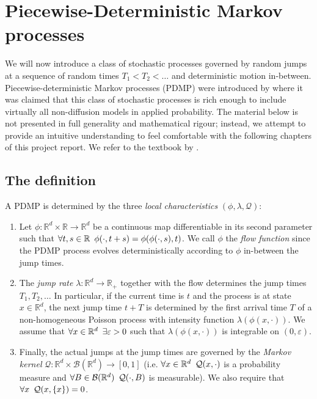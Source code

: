 \documentclass[report.tex]{subfiles}
\begin{document}
\section{Piecewise-Deterministic Markov processes}

We will now introduce a class of stochastic processes governed by random jumps at
a sequence of random times $T_{1} < T_{2} < \dots$ and deterministic motion
in-between. Piecewise-deterministic Markov processes (PDMP) were introduced by
\citet{davis1984piecewise} where it was claimed
that this class of stochastic processes is rich enough to include virtually
all non-diffusion models in applied probability.
The material below is not presented in full generality
and mathematical rigour; instead, we attempt to provide an intuitive
understanding to feel comfortable with the following chapters of this project
report.
We refer to the textbook by \citet{davis1993markov}.

\subsection{The definition}
\label{pdmp-definition}

A PDMP is determined by the three \textit{local characteristics}
$(\phi, \lambda, \mathcal{Q})$:

\begin{enumerate}
  \item Let $\phi : \mathbb{R}^{d} \times \mathbb{R} \to \mathbb{R}^{d}$
        be a continuous map differentiable in its second parameter such that
        $\forall t,s \in \mathbb{R} \enskip
        \phi(\cdot, t + s) = \phi(\phi(\cdot, s), t)$.
        We call $\phi$ the \textit{flow function} since the PDMP process evolves
        deterministically according to $\phi$ in-between the jump times.
  \item The \textit{jump rate}
        $\lambda : \mathbb{R}^{d} \to \mathbb{R}_{+}$
        together with the flow determines the jump times $T_{1}, T_{2}, \dots$
        In particular, if the current time is $t$ and the process is at state
        $x \in \mathbb{R}^{d}$, the next jump time $t + T$ is determined by
        the first arrival time $T$ of a non-homogeneous Poisson process
        with intensity function
        $\lambda(\phi(x, \cdot))$. We assume that
        $\forall x \in \mathbb{R}^{d} \enskip \exists \varepsilon > 0$ such that
        $\lambda(\phi(x, \cdot))$ is integrable on $(0, \varepsilon)$.

  \item Finally, the actual jumps at the jump times are governed by the
        \textit{Markov kernel}
        $\mathcal{Q} : \mathbb{R}^{d} \times \mathcal{B}(\mathbb{R}^{d})
         \to [0, 1]$
        (i.e. $\forall x \in \mathbb{R}^{d} \enskip \mathcal{Q}(x, \cdot)$
        is a probability measure
        and $\forall B \in \mathcal{B}(\mathbb{R}^{d}) \enskip
        \mathcal{Q}(\cdot, B)$ is measurable).
        We also require that $\forall x \enskip \mathcal{Q}(x, \{x\}) = 0$.
\end{enumerate}
\end{document}
